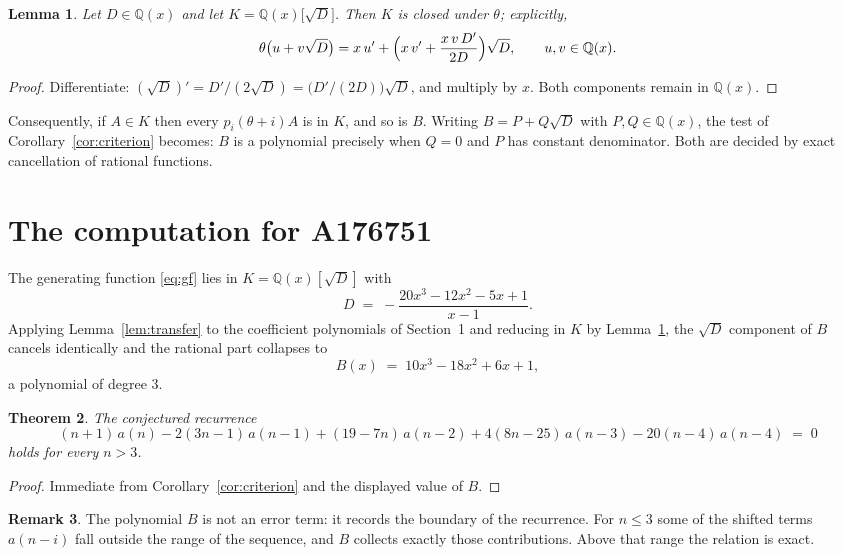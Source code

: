 \documentclass[11pt,a4paper]{article}
\theoremstyle{plain}
\newtheorem{theorem}{Theorem}
\newtheorem{lemma}[theorem]{Lemma}
\theoremstyle{definition}
\newtheorem{remark}[theorem]{Remark}
\begin{document}
\begin{lemma}\label{lem:field}
Let $D\in\mathbb{Q}(x)$ and let $K=\mathbb{Q}(x)\bigl[\sqrt{D}\bigr]$. Then $K$ is closed
under $\theta$; explicitly,
\[
\theta\bigl(u+v\sqrt{D}\bigr)=x\,u'+\Bigl(x\,v'+\frac{x\,v\,D'}{2D}\Bigr)\sqrt{D},
\qquad u,v\in\mathbb{Q}(x).
\]
\end{lemma}

\begin{proof}
Differentiate: $(\sqrt{D})'=D'/(2\sqrt{D})=\bigl(D'/(2D)\bigr)\sqrt{D}$, and multiply by
$x$. Both components remain in $\mathbb{Q}(x)$.
\end{proof}

Consequently, if $A\in K$ then every $p_{i}(\theta+i)A$ is in $K$, and so is $B$. Writing
$B=P+Q\sqrt{D}$ with $P,Q\in\mathbb{Q}(x)$, the test of Corollary~\ref{cor:criterion}
becomes: $B$ is a polynomial precisely when $Q=0$ and $P$ has constant denominator. Both
are decided by exact cancellation of rational functions.

\section{The computation for A176751}

The generating function \eqref{eq:gf} lies in $K=\mathbb{Q}(x)[\sqrt{D}]$ with
\[
D \;=\; - \frac{20 x^{3} - 12 x^{2} - 5 x + 1}{x - 1} .
\]
Applying Lemma~\ref{lem:transfer} to the coefficient polynomials of Section~1 and reducing
in $K$ by Lemma~\ref{lem:field}, the $\sqrt{D}$ component of $B$ cancels identically and
the rational part collapses to
\[
B(x)\;=\;10 x^{3} - 18 x^{2} + 6 x + 1 ,
\]
a polynomial of degree $3$.

\begin{theorem}
The conjectured recurrence
\[
(n + 1)\,a(n) -  2 \left(3 n - 1\right)\,a(n-1) + (19 - 7 n)\,a(n-2) + 4 \left(8 n - 25\right)\,a(n-3) -  20 \left(n - 4\right)\,a(n-4) \;=\;0
\]
holds for every $n>3$.
\end{theorem}

\begin{proof}
Immediate from Corollary~\ref{cor:criterion} and the displayed value of $B$.
\end{proof}

\begin{remark}
The polynomial $B$ is not an error term: it records the boundary of the recurrence. For
$n\le3$ some of the shifted terms $a(n-i)$ fall outside the range of the sequence,
and $B$ collects exactly those contributions. Above that range the relation is exact.
\end{remark}
\end{document}
